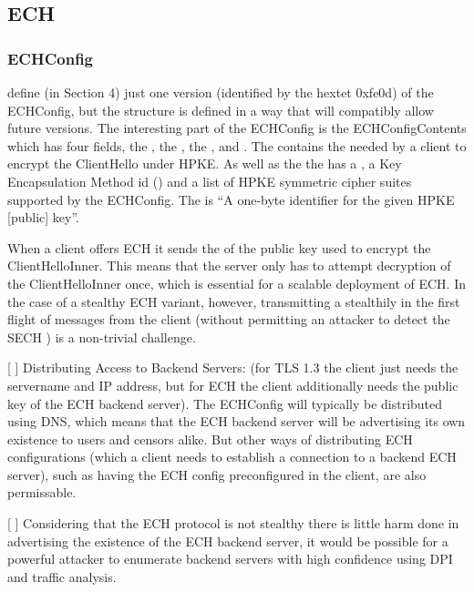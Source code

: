 \subsection{ECH}

\subsubsection{ECHConfig}

\cite{esni} define (in Section 4) just one version (identified by the hextet 0xfe0d) of the ECHConfig, but  the structure is defined in a way that will compatibly allow future versions. The interesting part of the ECHConfig is the ECHConfigContents which has four fields, the , the , the , and . The  contains the  needed by a client to encrypt the ClientHello under HPKE. As well as the  the  has a , a Key Encapsulation Method id () and a list of HPKE symmetric cipher suites supported by the ECHConfig. The  is ``A one-byte identifier for the given HPKE [public] key''.

When a client offers ECH it sends the  of the public key used to encrypt the ClientHelloInner. This  means that the server only has to attempt decryption of the ClientHelloInner once, which is essential for a scalable deployment of ECH. In the case of a stealthy ECH variant, however, transmitting a  stealthily in the first flight of messages from the client (without permitting an attacker to detect the SECH ) is a non-trivial challenge.

[ ] Distributing Access to Backend Servers: (for TLS 1.3 the client just needs the servername and IP address, but for ECH the client additionally needs the public key of the ECH backend server). The ECHConfig will typically be distributed using DNS, which means that the ECH backend server will be advertising its own existence to users and censors alike. But other ways of distributing ECH configurations (which a client needs to establish a connection to a backend ECH server), such as having the ECH config preconfigured in the client, are also permissable.

[ ] Considering that the ECH protocol is not stealthy there is little harm done in advertising the existence of the ECH backend server, it would be possible for a powerful attacker to enumerate backend servers with high confidence using DPI and traffic analysis.

